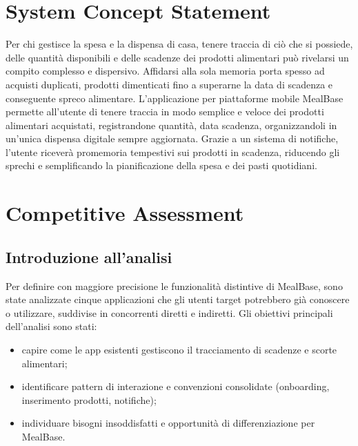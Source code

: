 \documentclass[11pt,a4paper]{article}
\begin{document}
\section{System Concept Statement}
\label{sec:scs}
Per chi gestisce la spesa e la dispensa di casa, tenere traccia di ciò che si possiede, delle quantità disponibili e delle scadenze dei prodotti alimentari 
può rivelarsi un compito complesso e dispersivo. Affidarsi alla sola memoria porta spesso ad acquisti duplicati, prodotti dimenticati fino a superarne la 
data di scadenza e conseguente spreco alimentare.
\newline
L'applicazione per piattaforme mobile MealBase permette all'utente di tenere traccia in modo semplice e veloce dei prodotti alimentari acquistati, 
registrandone quantità, data scadenza, organizzandoli in un'unica dispensa digitale sempre aggiornata.
\newline
Grazie a un sistema di notifiche, l'utente riceverà promemoria tempestivi sui prodotti in scadenza, riducendo gli sprechi e semplificando la pianificazione della spesa e dei pasti quotidiani.

\section{Competitive Assessment}
\label{sec:competitive}

\subsection{Introduzione all'analisi}
Per definire con maggiore precisione le funzionalità distintive di MealBase, sono state analizzate cinque applicazioni che gli utenti target potrebbero già conoscere o utilizzare, 
suddivise in concorrenti diretti e indiretti.
\newline
Gli obiettivi principali dell'analisi sono stati:
\begin{itemize}
  \item capire come le app esistenti gestiscono il tracciamento di scadenze e scorte alimentari;
  \item identificare pattern di interazione e convenzioni consolidate (onboarding, inserimento prodotti, notifiche);
  \item individuare bisogni insoddisfatti e opportunità di differenziazione per MealBase.
\end{itemize}
\end{document}
